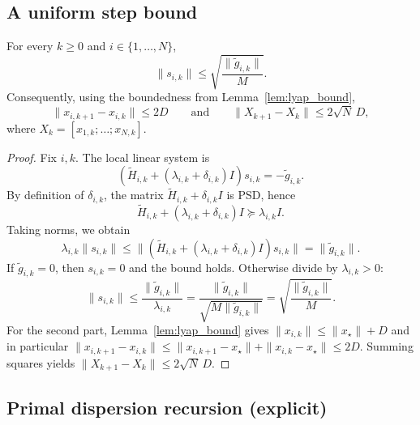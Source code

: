 \documentclass[review,onefignum,onetabnum]{siamart171218}
\begin{document}
	\subsection{A uniform step bound}
	
	\begin{lemma}\label{lem:step_bound_app}
		For every $k\ge0$ and $i\in\{1,\dots,N\}$,
		\[
		\|s_{i,k}\|\le \sqrt{\frac{\|\tilde g_{i,k}\|}{M}}.
		\]
		Consequently, using the boundedness from Lemma~\ref{lem:lyap_bound},
		\[
		\|x_{i,k+1}-x_{i,k}\|\le 2D
		\qquad\text{and}\qquad
		\|X_{k+1}-X_k\|\le 2\sqrt N\,D,
		\]
		where $X_k=[x_{1,k};\dots;x_{N,k}]$.
	\end{lemma}
	\begin{proof}
		Fix $i,k$. The local linear system is
		\[
		(\tilde H_{i,k}+(\lambda_{i,k}+\delta_{i,k})I)s_{i,k}=-\tilde g_{i,k}.
		\]
		By definition of $\delta_{i,k}$, the matrix $\tilde H_{i,k}+\delta_{i,k}I$ is PSD, hence
		\[
		\tilde H_{i,k}+(\lambda_{i,k}+\delta_{i,k})I \succeq \lambda_{i,k}I.
		\]
		Taking norms, we obtain
		\[
		\lambda_{i,k}\|s_{i,k}\|\le \|(\tilde H_{i,k}+(\lambda_{i,k}+\delta_{i,k})I)s_{i,k}\|=\|\tilde g_{i,k}\|.
		\]
		If $\tilde g_{i,k}=0$, then $s_{i,k}=0$ and the bound holds. Otherwise divide by $\lambda_{i,k}>0$:
		\[
		\|s_{i,k}\|\le \frac{\|\tilde g_{i,k}\|}{\lambda_{i,k}}
		=\frac{\|\tilde g_{i,k}\|}{\sqrt{M\|\tilde g_{i,k}\|}}
		=\sqrt{\frac{\|\tilde g_{i,k}\|}{M}}.
		\]
		For the second part, Lemma~\ref{lem:lyap_bound} gives $\|x_{i,k}\|\le \|x_\star\|+D$ and in particular
		$\|x_{i,k+1}-x_{i,k}\|\le \|x_{i,k+1}-x_\star\|+\|x_{i,k}-x_\star\|\le 2D$.
		Summing squares yields $\|X_{k+1}-X_k\|\le 2\sqrt N\,D$.
	\end{proof}
	
	\subsection{Primal dispersion recursion (explicit)}
	
\end{document}
